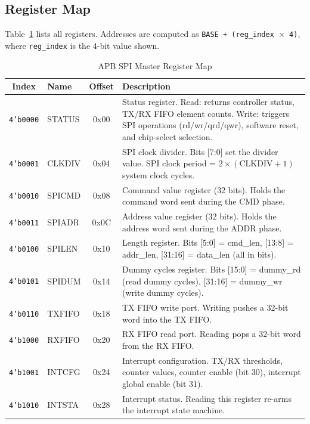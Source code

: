 \subsection{Register Map}

Table~\ref{tab:regmap} lists all registers. Addresses are computed as
\texttt{BASE + (reg\_index $\times$ 4)}, where \texttt{reg\_index} is the 4-bit value shown.

\begin{table}[H]
\centering
\caption{APB SPI Master Register Map}
\label{tab:regmap}
\small
\begin{tabularx}{\textwidth}{@{}clcX@{}}
\toprule
\textbf{Index} & \textbf{Name} & \textbf{Offset} & \textbf{Description} \\
\midrule
\texttt{4'b0000} & STATUS  & 0x00 & Status register. Read: returns controller status, TX/RX FIFO element counts. Write: triggers SPI operations (rd/wr/qrd/qwr), software reset, and chip-select selection. \\
\texttt{4'b0001} & CLKDIV  & 0x04 & SPI clock divider. Bits [7:0] set the divider value. SPI clock period = $2 \times (\text{CLKDIV}+1)$ system clock cycles. \\
\texttt{4'b0010} & SPICMD  & 0x08 & Command value register (32 bits). Holds the command word sent during the CMD phase. \\
\texttt{4'b0011} & SPIADR  & 0x0C & Address value register (32 bits). Holds the address word sent during the ADDR phase. \\
\texttt{4'b0100} & SPILEN  & 0x10 & Length register. Bits [5:0] = cmd\_len, [13:8] = addr\_len, [31:16] = data\_len (all in bits). \\
\texttt{4'b0101} & SPIDUM  & 0x14 & Dummy cycles register. Bits [15:0] = dummy\_rd (read dummy cycles), [31:16] = dummy\_wr (write dummy cycles). \\
\texttt{4'b0110} & TXFIFO  & 0x18 & TX FIFO write port. Writing pushes a 32-bit word into the TX FIFO. \\
\texttt{4'b1000} & RXFIFO  & 0x20 & RX FIFO read port. Reading pops a 32-bit word from the RX FIFO. \\
\texttt{4'b1001} & INTCFG  & 0x24 & Interrupt configuration. TX/RX thresholds, counter values, counter enable (bit 30), interrupt global enable (bit 31). \\
\texttt{4'b1010} & INTSTA  & 0x28 & Interrupt status. Reading this register re-arms the interrupt state machine. \\
\bottomrule
\end{tabularx}
\end{table}


